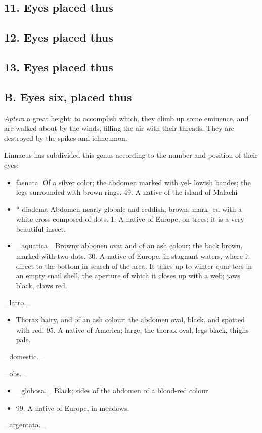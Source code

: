 \documentclass{article}
\begin{document}
\subsection*{11. Eyes placed thus}
\subsection*{12. Eyes placed thus}
\subsection*{13. Eyes placed thus}
\subsection*{B. Eyes six, placed thus}
\textit{Aptera}
a great height; to accomplish which, they climb up some eminence, and are walked about by the winds, filling the air with their threads. They are destroyed by the spikes and ichneumon.

Linnaeus has subdivided this genus according to the number and position of their eyes:

\begin{itemize}
\item fasnata. Of a silver color; the abdomen marked with yel- lowish bandes; the legs surrounded with brown rings. 49. A native of the island of Malachi
\item * diadema Abdomen nearly globale and reddish; brown, mark- ed with a white cross composed of dots. 1. A native of Europe, on trees; it is a very beautiful insect.
\item \_aquatica\_ Browny abbonen ovat and of an ash colour; the back brown, marked with two dots. 30. A native of Europe, in stagnant waters, where it direct to the bottom in search of the area. It takes up to winter quar-ters in an empty snail shell, the aperture of which it closes up with a web; jaws black, claws red.
\end{itemize}
\_latro.\_

\begin{itemize}
\item Thorax hairy, and of an ash colour; the abdomen oval, black, and spotted with red. 95. A native of America; large, the thorax oval, legs black, thighs pale.
\end{itemize}
\_domestic.\_

\_obs.\_

\begin{itemize}
\item \_globosa.\_ Black; sides of the abdomen of a blood-red colour.
\item 99. A native of Europe, in meadows.
\end{itemize}
\_argentata.\_
\end{document}
